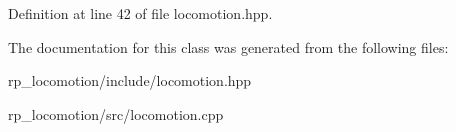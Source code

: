 \-Definition at line 42 of file locomotion.\-hpp.



\-The documentation for this class was generated from the following files\-:\begin{DoxyCompactItemize}
\item 
rp\-\_\-locomotion/include/locomotion.\-hpp\item 
rp\-\_\-locomotion/src/locomotion.\-cpp\end{DoxyCompactItemize}
